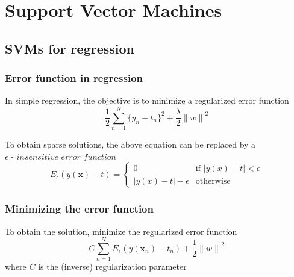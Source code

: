 \documentclass[t,14pt]{beamer}
\date[Introduction]{Support Vector Machines}
\begin{document}
\begin{frame}
  \titlepage
\end{frame}

\section{Support Vector Machines}

\subsection{SVMs for regression}

\begin{frame}
  \frametitle{Error function in regression}
  In simple regression, the objective is to minimize a regularized error 
  function
  \begin{equation}
    \frac{\displaystyle 1}{\displaystyle 2}
        \sum\limits_{n=1}^N \{y_n - t_n\}^2 + 
        \frac{\displaystyle \lambda}{\displaystyle 2}{\lVert w \rVert}^2
  \end{equation}

  To obtain sparse solutions, the above equation can be replaced by a 
  $\epsilon \textit{ - insensitive error function}$
  \begin{equation}
    E_\epsilon(y(\mathbf{x}) - t) = 
        \begin{cases}
            0 & \text{if } \lvert y(x) - t \rvert < \epsilon \\
            \lvert y(x) - t \rvert - \epsilon & \text{otherwise}
        \end{cases}
  \end{equation}
\end{frame}

\begin{frame}
  \frametitle{Minimizing the error function}
  To obtain the solution, minimize the regularized error function
  \begin{equation}
    C \sum\limits_{n=1}^N E_\epsilon(y(\mathbf{x}_n) - t_n) + 
      \frac{\displaystyle 1}{\displaystyle 2}{\lVert w \rVert}^2
  \end{equation} 
  where $C$ is the (inverse) regularization parameter
\end{frame}
\end{document}
